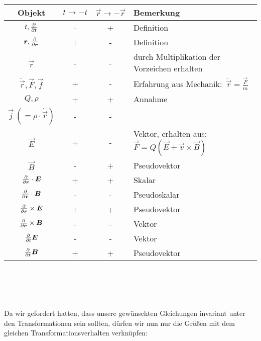 \begin{tabular}{c|c|c|l}
Objekt & $t\rightarrow-t$ & $\vec{r}\rightarrow-\vec{r}$ & Bemerkung\\
\hline $t, \frac{\partial{}}{\partial{t}}$ & - & + & Definition\\
$\bm{r},\frac{\partial{}}{\partial{\bm{r}}}$ & + & -& Definition\\
$\dot{\vec{r}}$ & -& - & durch Multiplikation der Vorzeichen erhalten\\
$\ddot{\vec{r}},\vec{F},\vec{f}$ & + & - & Erfahrung aus Mechanik:\ $\ddot{\vec{r}}=\frac{\vec{F}}{m}$\\
$Q,\rho$ & + & + & Annahme\\
$\vec{j}\ (=\rho\cdot\dot{\vec{r}})$ & - & - & \\
$\vec{E}$ & + & - & Vektor, erhalten aus: $\vec{F}=Q(\vec{E}+\vec{v}\times\vec{B})$\\
$\vec{B}$ & - & + & Pseudovektor\\
$\frac{\partial{}}{\partial{\bm{r}}}\cdot\bm{E}$ & + & + & Skalar\\
$\frac{\partial{}}{\partial{\bm{r}}}\cdot\bm{B}$ & - & - & Pseudoskalar\\
$\frac{\partial{}}{\partial{\bm{r}}}\times\bm{E}$ & + & + & Pseudovektor\\
$\frac{\partial{}}{\partial{\bm{r}}}\times\bm{B}$ & - & - & Vektor\\
$\frac{\partial{}}{\partial{t}}\bm{E}$ & - & - & Vektor\\
$\frac{\partial{}}{\partial{t}}\bm{B}$ & + & + & Pseudovektor
\end{tabular}
\ \\
\ \\
\ \\
\ \\
Da wir gefordert hatten, dass unsere gewünschten Gleichungen invariant unter den Transformationen sein sollten, dürfen wir nun nur die Größen mit dem gleichen Transformationsverhalten verknüpfen:\\
\ \\


